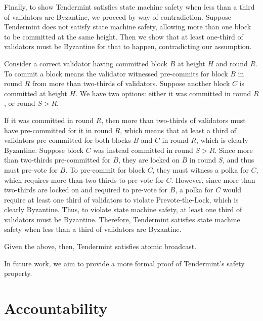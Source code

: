 Finally, to show Tendermint satisfies state machine safety when less than a third of 
validators are Byzantine, we proceed by way of contradiction.
Suppose Tendermint does not satisfy state machine safety, 
allowing more than one block to be committed at the same height.
Then we show that at least one-third of validators must be Byzantine for that to happen,
contradicting our assumption.

Consider a correct validator having committed block $B$ at height $H$ and round $R$.
To commit a block means the validator witnessed pre-commits 
for block $B$ in round $R$ from more than two-thirds of validators.
Suppose another block $C$ is committed at height $H$. 
We have two options: either it was committed in round $R$, or round $S > R$.

If it was committed in round $R$, then more than two-thirds of validators
must have pre-committed for it in round $R$, which means that at least a third of validators 
pre-committed for both blocks $B$ and $C$ in round $R$, which is clearly Byzantine.
Suppose block $C$ was instead committed in round $S > R$.
Since more than two-thirds pre-committed for $B$, they are locked on $B$ in round $S$,
and thus must pre-vote for $B$. To pre-commit for block $C$, they must 
witness a polka for $C$, which requires more than two-thirds to pre-vote for $C$.
However, since more than two-thirds are locked on and required to pre-vote for $B$,
a polka for $C$ would require at least one third of validators to violate Prevote-the-Lock,
which is clearly Byzantine.
Thus, to violate state machine safety, at least one third of validators must be Byzantine.
Therefore, Tendermint satisfies state machine safety when less than a third of validators are Byzantine.

Given the above, then, Tendermint satisfies atomic broadcast.

In future work, we aim to provide a more formal proof of Tendermint's safety property.

%
%
%


\section{Accountability}

